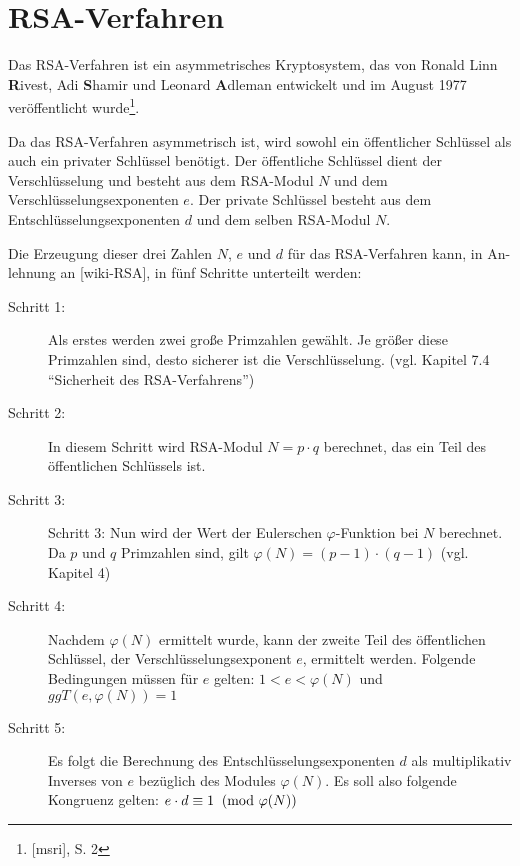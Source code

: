 \section{RSA-Verfahren}
Das RSA-Verfahren ist ein asymmetrisches Kryptosystem, das von 
Ronald Linn \textbf{R}ivest, Adi \textbf{S}hamir und Leonard 
\textbf{A}dleman entwickelt und im August 1977 veröffentlicht wurde\footnote{[msri], S. 2}.

Da das RSA-Verfahren asymmetrisch ist, wird sowohl ein öffentlicher 
Schlüssel als auch ein privater Schlüssel benötigt. Der öffentliche 
Schlüssel dient der Verschlüsselung und besteht aus dem RSA-Modul $N$ 
und dem Verschlüsselungsexponenten $e$. Der private Schlüssel 
besteht aus dem Entschlüsselungsexponenten $d$ und dem selben RSA-Modul $N$.

Die Erzeugung dieser drei Zahlen $N$, $e$ und $d$ für das RSA-Verfahren 
kann, in An-lehnung an [wiki-RSA], in fünf Schritte unterteilt werden:

\begin{description}
    \item[Schritt 1:] Als erstes werden zwei große Primzahlen  gewählt. 
                      Je größer diese Primzahlen sind, desto sicherer 
                      ist die Verschlüsselung.
                     (vgl. Kapitel 7.4 "`Sicherheit des RSA-Verfahrens"')
    \item[Schritt 2:] In diesem Schritt wird RSA-Modul $N = p \cdot q$ 
                      berechnet, das ein Teil des öffentlichen 
                      Schlüssels ist.
    \item[Schritt 3:] Schritt 3: Nun wird der Wert der Eulerschen 
                      $\varphi$-Funktion bei $N$ berechnet. Da $p$ 
                      und $q$ Primzahlen sind, gilt $\varphi(N) = (p-1) \cdot (q-1)$ (vgl. Kapitel 4) %
    \item[Schritt 4:] Nachdem $\varphi(N)$ ermittelt wurde, kann der 
                      zweite Teil des öffentlichen Schlüssel, der 
                      Verschlüsselungsexponent $e$, ermittelt werden. 
                      Folgende Bedingungen müssen für $e$ gelten:
                      $1 < e < \varphi(N) $  und $ggT(e, \varphi(N)) = 1$
    \item[Schritt 5:] Es folgt die Berechnung des Entschlüsselungsexponenten 
                      $d$ als multiplikativ Inverses von $e$ 
                      bezüglich des Modules $\varphi(N)$. Es soll 
                      also folgende Kongruenz gelten:
                      $e \cdot d \equiv 1 \imod{\varphi(N)}$

\end{description}


